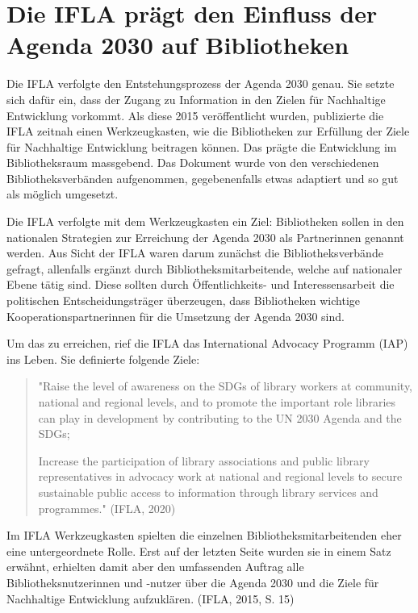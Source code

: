\documentclass[a4paper,
fontsize=11pt,
oneside,
numbers=noperiodatend,
parskip=half-,
bibliography=totoc,
final
]{scrartcl}
\begin{document}
\hypertarget{die-ifla-pruxe4gt-den-einfluss-der-agenda-2030-auf-bibliotheken}{%
\section{Die IFLA prägt den Einfluss der Agenda 2030 auf
Bibliotheken}\label{die-ifla-pruxe4gt-den-einfluss-der-agenda-2030-auf-bibliotheken}}

Die IFLA verfolgte den Entstehungsprozess der Agenda 2030 genau. Sie
setzte sich dafür ein, dass der Zugang zu Information in den Zielen für
Nachhaltige Entwicklung vorkommt. Als diese 2015 veröffentlicht wurden,
publizierte die IFLA zeitnah einen Werkzeugkasten, wie die Bibliotheken
zur Erfüllung der Ziele für Nachhaltige Entwicklung beitragen können.
Das prägte die Entwicklung im Bibliotheksraum massgebend. Das Dokument
wurde von den verschiedenen Bibliotheksverbänden aufgenommen,
gegebenenfalls etwas adaptiert und so gut als möglich umgesetzt.

Die IFLA verfolgte mit dem Werkzeugkasten ein Ziel: Bibliotheken sollen
in den nationalen Strategien zur Erreichung der Agenda 2030 als
Partnerinnen genannt werden. Aus Sicht der IFLA waren darum zunächst die
Bibliotheksverbände gefragt, allenfalls ergänzt durch
Bibliotheksmitarbeitende, welche auf nationaler Ebene tätig sind. Diese
sollten durch Öffentlichkeits- und Interessensarbeit die politischen
Entscheidungsträger überzeugen, dass Bibliotheken wichtige
Kooperationspartnerinnen für die Umsetzung der Agenda 2030 sind.

Um das zu erreichen, rief die IFLA das International Advocacy Programm
(IAP) ins Leben. Sie definierte folgende Ziele:

\begin{quote}
"Raise the level of awareness on the SDGs of library workers at
community, national and regional levels, and to promote the important
role libraries can play in development by contributing to the UN 2030
Agenda and the SDGs;

Increase the participation of library associations and public library
representatives in advocacy work at national and regional levels to
secure sustainable public access to information through library services
and programmes." (IFLA, 2020)
\end{quote}

Im IFLA Werkzeugkasten spielten die einzelnen Bibliotheksmitarbeitenden
eher eine untergeordnete Rolle. Erst auf der letzten Seite wurden sie in
einem Satz erwähnt, erhielten damit aber den umfassenden Auftrag alle
Bibliotheksnutzerinnen und -nutzer über die Agenda 2030 und die Ziele
für Nachhaltige Entwicklung aufzuklären. (IFLA, 2015, S. 15)
\end{document}
